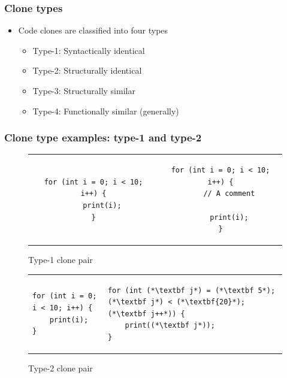 \documentclass[aspectratio=1610]{beamer}
\begin{document}
\begin{frame}
	\frametitle{Clone types}
	\begin{itemize}
		\item Code clones are classified into four types
		      \begin{itemize}
			      \item Type-1: Syntactically identical
			      \item Type-2: Structurally identical
			      \item Type-3: Structurally similar
			      \item Type-4: Functionally similar (generally)
		      \end{itemize}
	\end{itemize}
\end{frame}


\begin{frame}[fragile]
	\frametitle{Clone type examples: type-1 and type-2}
    \begin{figure}[t]
		\begin{center}
			\begin{tabular}{c | c}
				\begin{lstlisting}
for (int i = 0; i < 10;   i++) {
    print(i);
}
\end{lstlisting} &
				\begin{lstlisting}
for (int i = 0; i < 10; i++) {
    // A comment

    print(i);
}
            \end{lstlisting}
			\end{tabular}
		\end{center}
        \caption{Type-1 clone pair}
    \end{figure}
    \begin{figure}[t]
        	\begin{center}
        \begin{tabular}{p{6cm} | p{6cm}}
\begin{lstlisting}
for (int i = 0; i < 10; i++) {
    print(i);
}
\end{lstlisting} & \begin{lstlisting}
for (int (*\textbf j*) = (*\textbf 5*); (*\textbf j*) < (*\textbf{20}*); (*\textbf j++*)) {
    print((*\textbf j*));
}
\end{lstlisting}
		\end{tabular}
	\end{center}

        \caption{Type-2 clone pair}
    \end{figure}

\end{frame}
\end{document}
